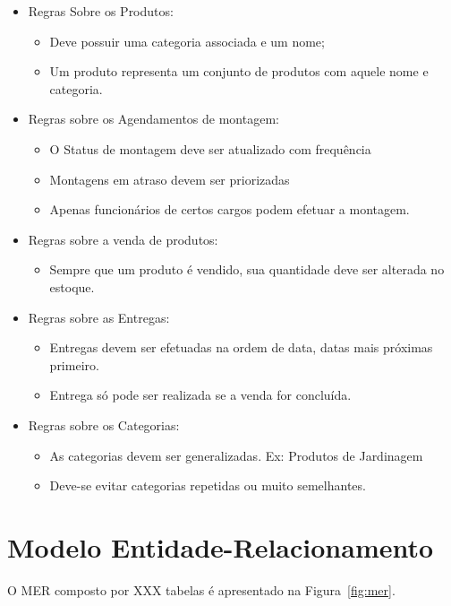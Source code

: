 \documentclass[
12pt,
a4paper,
semrecuonosumario,
sumario = abnt-6027-2012]{report}
\begin{document}
	\begin{itemize}
		\item Regras Sobre os Produtos:
			\begin{itemize}
				\item Deve possuir uma categoria associada e um nome;
				\item Um produto representa um conjunto de produtos com aquele nome e categoria.
			\end{itemize}
		\item Regras sobre os Agendamentos de montagem:
			\begin{itemize}
				\item O Status de montagem deve ser atualizado com frequência
				\item Montagens em atraso devem ser priorizadas
				\item Apenas funcionários de certos cargos podem efetuar a montagem.
			\end{itemize}
		\item Regras sobre a venda de produtos:
			\begin{itemize}
				\item Sempre que um produto é vendido, sua quantidade deve ser alterada no estoque.
			\end{itemize}
		\item Regras sobre as Entregas:
			\begin{itemize}
				\item Entregas devem ser efetuadas na ordem de data, datas mais próximas primeiro.
				\item Entrega só pode ser realizada se a venda for concluída.
			\end{itemize}
		\item Regras sobre os Categorias:
			\begin{itemize}
				\item As categorias devem ser generalizadas. Ex: Produtos de Jardinagem
				\item Deve-se evitar categorias repetidas ou muito semelhantes.
			\end{itemize}
	\end{itemize}
    
    \section{Modelo Entidade-Relacionamento}\label{sec:mer}
     O MER composto por XXX tabelas é apresentado na Figura~\ref{fig:mer}.
    
\end{document}
